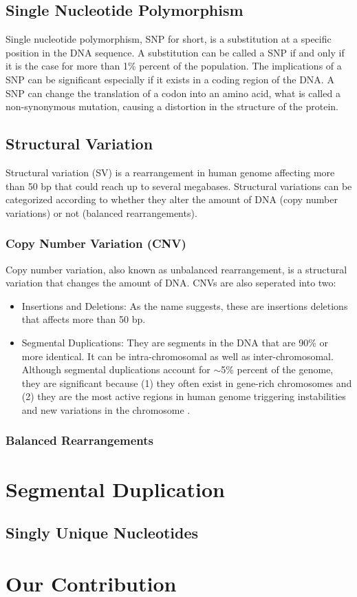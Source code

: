 \subsection{Single Nucleotide Polymorphism}
Single nucleotide polymorphism, SNP for short, is a substitution at a specific position in the DNA sequence. A substitution can be called a SNP if and only if it is the case for more than 1\% percent of the population. The implications of a SNP can be significant especially if it exists in a coding region of the DNA. A SNP can change the translation of a codon into an amino acid, what is called a non-synonymous mutation, causing a distortion in the structure of the protein. 


\subsection{Structural Variation}
Structural variation (SV) is a rearrangement in human genome affecting more than 50 bp that could reach up to several megabases. Structural variations can be categorized according to whether they alter the amount of DNA (copy number variations) or not (balanced rearrangements). 

\subsubsection{Copy Number Variation (CNV)}
Copy number variation, also known as unbalanced rearrangement, is a structural variation that changes the amount of DNA. CNVs are also seperated into two:
\begin{itemize}
  \item Insertions and Deletions: As the name suggests, these are insertions deletions that affects more than 50 bp.
  \item Segmental Duplications: They are segments in the DNA that are 90\% or more identical. It can be intra-chromosomal as well as inter-chromosomal. Although segmental duplications account for $\sim$5\% percent of the genome, they are significant because (1) they often exist in gene-rich chromosomes \cite{bailey2002recent} and (2) they are the most active regions in human genome triggering instabilities and new variations in the chromosome \cite{samonte2002segmental}.
\end{itemize}
\subsubsection{Balanced Rearrangements}


\section{Segmental Duplication}
\subsection{Singly Unique Nucleotides}
\section{Our Contribution}
\newpage
